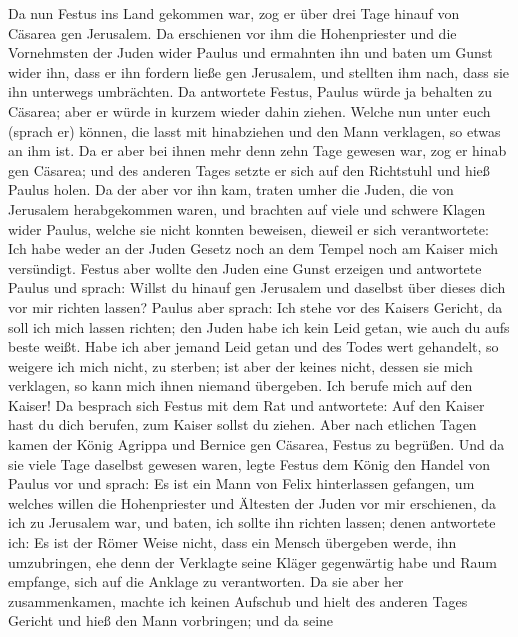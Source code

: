 Da nun Festus ins Land gekommen war, zog er über drei Tage hinauf von
Cäsarea gen Jerusalem.  Da erschienen vor ihm die
Hohenpriester und die Vornehmsten der Juden wider Paulus und ermahnten
ihn  und baten um Gunst wider ihn, dass er ihn fordern ließe
gen Jerusalem, und stellten ihm nach, dass sie ihn unterwegs umbrächten.
 Da antwortete Festus, Paulus würde ja behalten zu Cäsarea;
aber er würde in kurzem wieder dahin ziehen.  Welche nun
unter euch (sprach er) können, die lasst mit hinabziehen und den Mann
verklagen, so etwas an ihm ist.  Da er aber bei ihnen mehr
denn zehn Tage gewesen war, zog er hinab gen Cäsarea; und des anderen
Tages setzte er sich auf den Richtstuhl und hieß Paulus holen.
 Da der aber vor ihn kam, traten umher die Juden, die von
Jerusalem herabgekommen waren, und brachten auf viele und schwere Klagen
wider Paulus, welche sie nicht konnten beweisen,  dieweil er
sich verantwortete: Ich habe weder an der Juden Gesetz noch an dem
Tempel noch am Kaiser mich versündigt.  Festus aber wollte
den Juden eine Gunst erzeigen und antwortete Paulus und sprach: Willst
du hinauf gen Jerusalem und daselbst über dieses dich vor mir richten
lassen?  Paulus aber sprach: Ich stehe vor des Kaisers
Gericht, da soll ich mich lassen richten; den Juden habe ich kein Leid
getan, wie auch du aufs beste weißt.  Habe ich aber jemand
Leid getan und des Todes wert gehandelt, so weigere ich mich nicht, zu
sterben; ist aber der keines nicht, dessen sie mich verklagen, so kann
mich ihnen niemand übergeben. Ich berufe mich auf den Kaiser!
 Da besprach sich Festus mit dem Rat und antwortete: Auf
den Kaiser hast du dich berufen, zum Kaiser sollst du ziehen.
 Aber nach etlichen Tagen kamen der König Agrippa und
Bernice gen Cäsarea, Festus zu begrüßen.  Und da sie viele
Tage daselbst gewesen waren, legte Festus dem König den Handel von
Paulus vor und sprach: Es ist ein Mann von Felix hinterlassen gefangen,
 um welches willen die Hohenpriester und Ältesten der Juden
vor mir erschienen, da ich zu Jerusalem war, und baten, ich sollte ihn
richten lassen;  denen antwortete ich: Es ist der Römer
Weise nicht, dass ein Mensch übergeben werde, ihn umzubringen, ehe denn
der Verklagte seine Kläger gegenwärtig habe und Raum empfange, sich auf
die Anklage zu verantworten.  Da sie aber her
zusammenkamen, machte ich keinen Aufschub und hielt des anderen Tages
Gericht und hieß den Mann vorbringen;  und da seine
